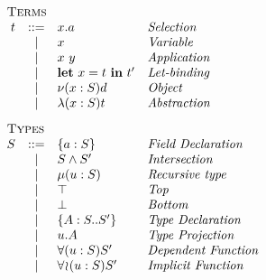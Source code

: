 \begin{minipage}[t]{.5\textwidth}\[\begin{array}{r c l l}
    \multicolumn{4}{l}{\textsc{Terms}}                      \\
    t & ::= & x.a             & \textit{Selection         } \\
      &  |  & x               & \textit{Variable          } \\
      &  |  & x\ y            & \textit{Application       } \\
      &  |  & \LET{x}{t}{t'}  & \textit{Let-binding       } \\
      &  |  & \OBJ{x}{S}{d}   & \textit{Object            } \\
      &  |  & \ABS{x}{S}{t}   & \textit{Abstraction       } \\[3mm]
    \multicolumn{4}{l}{\textsc{Types}}                      \\
    S & ::= & \FDEC{a}{S}     & \textit{Field Declaration } \\
      &  |  & \AGG{S}{S'}     & \textit{Intersection      } \\
      &  |  & \REC{u}{S}      & \textit{Recursive type    } \\
      &  |  & \top            & \textit{Top               } \\
      &  |  & \bot            & \textit{Bottom            } \\
      &  |  & \TDEC{A}{S}{S'} & \textit{Type Declaration  } \\
      &  |  & u.A             & \textit{Type Projection   } \\
      &  |  & \DFUN{u}{S}{S'} & \textit{Dependent Function} \\
      &  |  & \IFUN{u}{S}{S'} & \textit{Implicit Function }
\end{array}\]\end{minipage}
